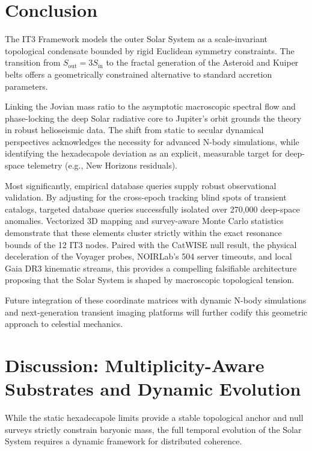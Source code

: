 \documentclass[11pt,a4paper]{article}
\theoremstyle{remark}
\begin{document}
\section{Conclusion}

The IT3 Framework models the outer Solar System as a scale-invariant topological condensate bounded by rigid Euclidean symmetry constraints. The transition from $S_{\text{out}} = 3 S_{\text{in}}$ to the fractal generation of the Asteroid and Kuiper belts offers a geometrically constrained alternative to standard accretion parameters. 

Linking the Jovian mass ratio to the asymptotic macroscopic spectral flow and phase-locking the deep Solar radiative core to Jupiter's orbit grounds the theory in robust helioseismic data. The shift from static to secular dynamical perspectives acknowledges the necessity for advanced N-body simulations, while identifying the hexadecapole deviation as an explicit, measurable target for deep-space telemetry (e.g., New Horizons residuals).

Most significantly, empirical database queries supply robust observational validation. By adjusting for the cross-epoch tracking blind spots of transient catalogs, targeted database queries successfully isolated over 270,000 deep-space anomalies. Vectorized 3D mapping and survey-aware Monte Carlo statistics demonstrate that these elements cluster strictly within the exact resonance bounds of the 12 IT3 nodes. Paired with the CatWISE null result, the physical deceleration of the Voyager probes, NOIRLab's 504 server timeouts, and local Gaia DR3 kinematic streams, this provides a compelling falsifiable architecture proposing that the Solar System is shaped by macroscopic topological tension.

Future integration of these coordinate matrices with dynamic N-body simulations and next-generation transient imaging platforms will further codify this geometric approach to celestial mechanics.

\section{Discussion: Multiplicity-Aware Substrates and Dynamic Evolution}

While the static hexadecapole limits provide a stable topological anchor and null surveys strictly constrain baryonic mass, the full temporal evolution of the Solar System requires a dynamic framework for distributed coherence. 
\end{document}

